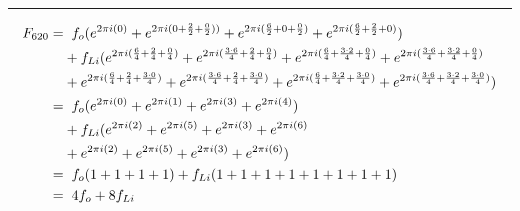 \documentclass{article}
\begin{document}
\noindent\rule{12cm}{0.4pt}
\begin{align*}
	F_{620} =& \hspace{0.2cm}  f_{o}  (e^{2 \pi i (0)} 
	+ e^{2 \pi i (0 + \frac{2}{2} + \frac{0}{2}))} 
	+ e^{2 \pi i (\frac{6}{2} + 0 + \frac{0}{2})} 
	+ e^{2 \pi i (\frac{6}{2} + \frac{2}{2} + 0)})  \\
	&+ f_{Li} (e^{2 \pi i (\frac{6}{4} + \frac{2}{4} + \frac{0}{4})}  
	+ e^{2 \pi i (\frac{3 \cdot 6}{4} + \frac{2}{4} + \frac{0}{4})} 
	+ e^{2 \pi i (\frac{6}{4} + \frac{3 \cdot 2}{4} + \frac{0}{4})} 
	+ e^{2 \pi i (\frac{3 \cdot 6}{4} + \frac{3 \cdot 2}{4} + \frac{0}{4})} \\
	&+ e^{2 \pi i (\frac{6}{4} + \frac{2}{4} + \frac{3 \cdot 0}{4})}
	+ e^{2 \pi i (\frac{3 \cdot 6}{4} + \frac{2}{4} + \frac{3 \cdot 0}{4})} 
	+ e^{2 \pi i (\frac{6}{4} + \frac{3 \cdot 2}{4} + \frac{3 \cdot 0}{4})} 
	+ e^{2 \pi i (\frac{3 \cdot 6}{4} + \frac{3 \cdot 2}{4} + \frac{3 \cdot 0}{4})}) \\  
	=& \hspace{0.2cm}  f_{o}  (e^{2 \pi i (0)} 
	+ e^{2 \pi i (1)} 
	+ e^{2 \pi i (3)} 
	+ e^{2 \pi i (4)})  \\
	&+ f_{Li} (e^{2 \pi i (2)}  
	+ e^{2 \pi i (5)} 
	+ e^{2 \pi i (3)} 
	+ e^{2 \pi i (6)} \\
	&+ e^{2 \pi i (2)}
	+ e^{2 \pi i (5)} 
	+ e^{2 \pi i (3)} 
	+ e^{2 \pi i (6)}) \\
	=& \hspace{0.2cm}  f_{o}  (1  + 1 + 1 + 1) + f_{Li}(1 + 1 + 1 + 1 + 1 + 1 + 1 + 1) \\
	=& \hspace{0.2cm} 4f_{o}   + 8f_{Li}
\end{align*}
\end{document}

